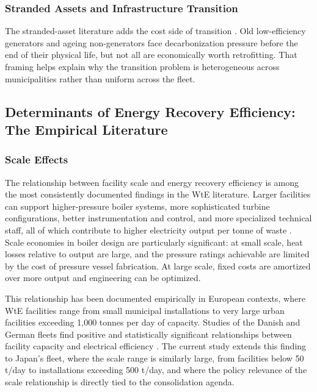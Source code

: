 \documentclass[12pt,a4paper]{article}
\begin{document}
\subsubsection{Stranded Assets and Infrastructure Transition}

The stranded-asset literature adds the cost side of transition \citep{Caldecott2016}. Old low-efficiency generators and ageing non-generators face decarbonization pressure before the end of their physical life, but not all are economically worth retrofitting. That framing helps explain why the transition problem is heterogeneous across municipalities rather than uniform across the fleet.

\subsection{Determinants of Energy Recovery Efficiency: The Empirical Literature}

\subsubsection{Scale Effects}

The relationship between facility scale and energy recovery efficiency is among the most consistently documented findings in the WtE literature. Larger facilities can support higher-pressure boiler systems, more sophisticated turbine configurations, better instrumentation and control, and more specialized technical staff, all of which contribute to higher electricity output per tonne of waste \citep{Genon2008}. Scale economies in boiler design are particularly significant: at small scale, heat losses relative to output are large, and the pressure ratings achievable are limited by the cost of pressure vessel fabrication. At large scale, fixed costs are amortized over more output and engineering can be optimized.

This relationship has been documented empirically in European contexts, where WtE facilities range from small municipal installations to very large urban facilities exceeding 1,000 tonnes per day of capacity. Studies of the Danish and German fleets find positive and statistically significant relationships between facility capacity and electrical efficiency \citep{Munster2010}. The current study extends this finding to Japan's fleet, where the scale range is similarly large, from facilities below 50 t/day to installations exceeding 500 t/day, and where the policy relevance of the scale relationship is directly tied to the consolidation agenda.
\end{document}
